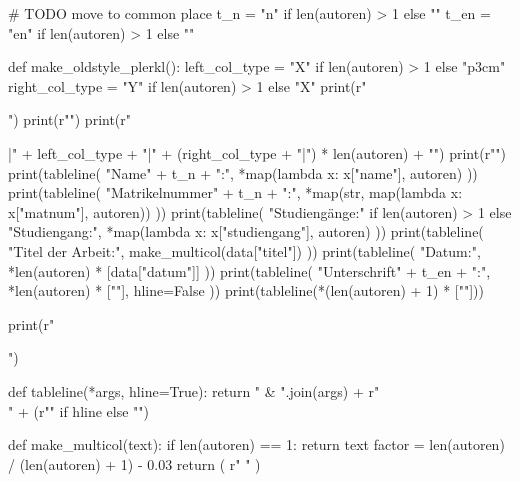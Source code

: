 \arrayrulewidth=0.5pt

\begin{pycode}

# TODO move to common place
t_n = "n" if len(autoren) > 1 else ""
t_en = "en" if len(autoren) > 1 else ""

def make_oldstyle_plerkl():
    left_col_type = "X" if len(autoren) > 1 else "p{3cm}"
    right_col_type = "Y" if len(autoren) > 1 else "X"
    print(r"\begin{table}[H] \centering")
    print(r"")
    print(r"\begin{tabularx}{\columnwidth}{|" + left_col_type + "|" + (right_col_type + "|") * len(autoren) + "}")
    print(r"\hline")
    print(tableline(
        "Name" + t_n + ":",
        *map(lambda x: x["name"], autoren)
    ))
    print(tableline(
        "Matrikelnummer" + t_n + ":",
        *map(str, map(lambda x: x["matnum"], autoren))
    ))
    print(tableline(
        "Studiengänge:" if len(autoren) > 1 else "Studiengang:",
        *map(lambda x: x["studiengang"], autoren)
    ))
    print(tableline(
        "Titel der Arbeit:",
        make_multicol(data["titel"])
    ))
    print(tableline(
        "Datum:",
        *len(autoren) * [data["datum"]]
	))
    print(tableline(
        "Unterschrift" + t_en + ":",
        *len(autoren) * [""],
        hline=False
    ))
    print(tableline(*(len(autoren) + 1) * [""]))

    print(r"\end{tabularx} \end{table}")

def tableline(*args, hline=True):
    return " & ".join(args) + r"\\" + (r"\hline" if hline else "")

def make_multicol(text):
    if len(autoren) == 1:
        return text
    factor = len(autoren) / (len(autoren) + 1) - 0.03
    return (
        r" "
    )


\end{pycode}
